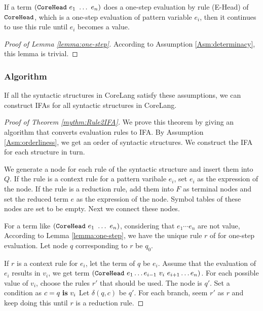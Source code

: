 \begin{lemma}
    \label{lemma:one-step}
    If a term $(\mbox{\tt CoreHead}~e_1~\ldots~e_n)$ does a one-step evaluation by rule (E-Head) of $\mbox{\tt CoreHead}$, which is a one-step evaluation of pattern variable $e_i$, then it continues to use this rule until $e_i$ becomes a value.
\end{lemma}

\begin{proof}[Proof of Lemma \ref{lemma:one-step}]
    According to Assumption \ref{Asm:determinacy}, this lemma is trivial.
\end{proof}

\subsubsection{Algorithm}

\begin{mythm}
    \label{mythm:Rule2IFA}
    If all the syntactic structures in CoreLang satisfy these assumptions, we can construct IFAs for all syntactic structures in CoreLang.
\end{mythm}

\begin{proof}[Proof of Theorem \ref{mythm:Rule2IFA}]

    We prove this theorem by giving an algorithm that converts evaluation rules to IFA. By Assumption \ref{Asm:orderliness}, we get an order of syntactic structures. We construct the IFA for each structure in turn.

    We generate a node for each rule of the syntactic structure  and insert them into $Q$. If the rule is a context rule for a pattern varibale $e_i$, set $e_i$ as the expression of the node. If the rule is a reduction rule, add them into $F$ as terminal nodes and set the reduced term $e$ as the expression of the node. Symbol tables of these nodes are set to be empty. Next we connect these nodes.

    For a term like $(\mbox{\tt CoreHead}~e_1~\ldots~e_n)$, considering that $e_1\cdots e_n$ are not value, According to Lemma \ref{lemma:one-step}, we have the unique rule $r$ of  for one-step evaluation. Let node $q$ corresponding to $r$ be $q_0$.

    If $r$ is a context rule for $e_i$, let the term of $q$ be $e_i$. Assume that the evaluation of $e_i$ results in $v_i$, we get term $(\mbox{\tt CoreHead}~e_1 \ldots e_{i-1}~v_i~e_{i+1} \ldots e_n)$. For each possible value of $v_i$, choose the rules $r'$ that should be used. The node is $q'$. Set a condition as $c=q~\mbox{\rm \bf is}~v_i$ Let $\delta(q, c)$ be $q'$. For each branch, seem $r'$ as $r$ and keep doing this until $r$ is a reduction rule.
\end{proof}

